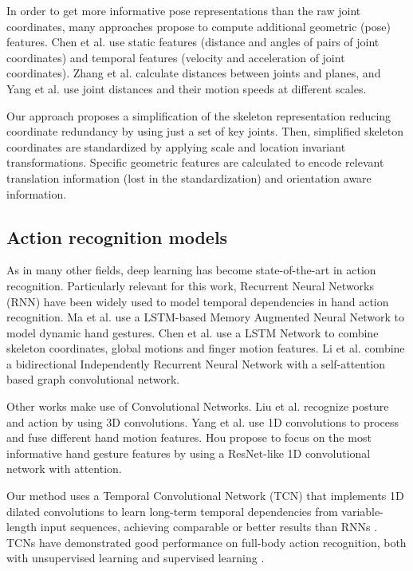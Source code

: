 \documentclass[letterpaper, 10 pt, conference]{ieeeconf}
\begin{document}
In order to get more informative pose representations than the raw joint coordinates, many approaches propose to compute additional geometric (pose) features. Chen et al. \cite{chen2010learning} use static features (distance and angles of pairs of joint coordinates) and temporal features (velocity and acceleration of joint coordinates).
Zhang et al. \cite{zhang2017geometric} calculate distances between joints and planes, and Yang et al. \cite{yang2019make} use joint distances and their motion speeds at different scales.


Our approach proposes a simplification of the skeleton representation reducing coordinate redundancy by using just a set of key joints. 
Then, simplified skeleton coordinates are standardized by applying scale and location invariant transformations. Specific geometric features are calculated to encode relevant translation information (lost in the standardization) and orientation aware information.

\subsection{Action recognition models}

As in many other fields, deep learning has become state-of-the-art in action recognition. Particularly relevant for this work, Recurrent Neural Networks (RNN) have been widely used to model temporal dependencies in hand action recognition.
Ma et al. \cite{ma2020skeleton} use a LSTM-based Memory Augmented Neural Network to model dynamic hand gestures. Chen et al. \cite{chen2019mfa} use a LSTM Network to combine skeleton coordinates, global motions and finger motion features. Li et al.  \cite{li2021two} combine a bidirectional Independently Recurrent Neural Network with a self-attention based graph convolutional network.

Other works make use of Convolutional Networks. Liu et al. \cite{liu20203d} recognize posture and action by using 3D convolutions. Yang et al. \cite{yang2019make} use  1D convolutions to process and fuse different hand motion features. Hou \cite{hou2018spatial} propose  to focus on the most informative hand gesture features by using a  ResNet-like 1D convolutional network with attention.

Our method uses a Temporal Convolutional Network (TCN) \cite{bai2018empirical, oord2016wavenet} that implements 1D dilated convolutions to learn long-term temporal dependencies from variable-length input sequences, achieving comparable or better results than RNNs \cite{bai2018empirical}. 
TCNs have demonstrated good performance on full-body action recognition, both with unsupervised learning \cite{su2020predict} and supervised learning \cite{sabater2021oneshot, kim2017interpretable}.
\end{document}
